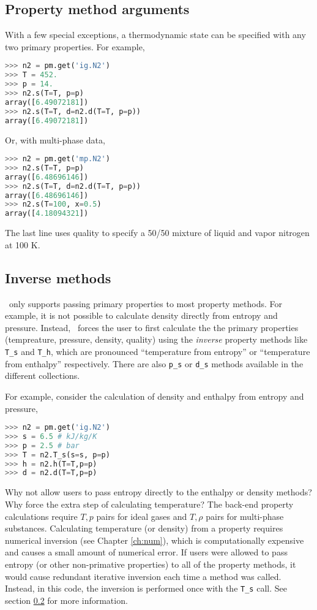 \subsection{Property method arguments}

With a few special exceptions, a thermodynamic state can be specified with any two primary properties.  For example,
\begin{lstlisting}[language=Python]
>>> n2 = pm.get('ig.N2')
>>> T = 452.
>>> p = 14.
>>> n2.s(T=T, p=p)
array([6.49072181])
>>> n2.s(T=T, d=n2.d(T=T, p=p))
array([6.49072181])
\end{lstlisting}
Or, with multi-phase data,
\begin{lstlisting}[language=Python]
>>> n2 = pm.get('mp.N2')
>>> n2.s(T=T, p=p)
array([6.48696146])
>>> n2.s(T=T, d=n2.d(T=T, p=p))
array([6.48696146])
>>> n2.s(T=100, x=0.5)
array([4.18094321])
\end{lstlisting}
The last line uses quality to specify a 50/50 mixture of liquid and vapor nitrogen at 100 K.

\subsection{Inverse methods}\label{sec:start:inverse}

\PM\ only supports passing primary properties to most property methods.  For example, it is not possible to calculate density directly from entropy and pressure.  Instead, \PM\ forces the user to first calculate the the primary properties (tempreature, pressure, density, quality) using the \emph{inverse} property methods like \verb|T_s| and \verb|T_h|, which are pronounced ``temperature from entropy'' or ``temperature from enthalpy'' respectively.  There are also \verb|p_s| or \verb|d_s| methods available in the different collections.

For example, consider the calculation of density and enthalpy from entropy and pressure,
\begin{lstlisting}[language=Python]
>>> n2 = pm.get('ig.N2')
>>> s = 6.5 # kJ/kg/K
>>> p = 2.5 # bar
>>> T = n2.T_s(s=s, p=p)
>>> h = n2.h(T=T,p=p)
>>> d = n2.d(T=T,p=p)
\end{lstlisting}

Why not allow users to pass entropy directly to the enthalpy or density methods?  Why force the extra step of calculating temperature?  The back-end property calculations require $T,p$ pairs for ideal gases and $T,\rho$ pairs for multi-phase substances.  Calculating temperature (or density) from a property requires numerical inversion (see Chapter \ref{ch:num}), which is computationally expensive and causes a small amount of numerical error.  If users were allowed to pass entropy (or other non-primative properties) to all of the property methods, it would cause redundant iterative inversion each time a method was called.  Instead, in this code, the inversion is performed once with the \verb|T_s| call.  See section \ref{sec:start:inverse} for more information.

